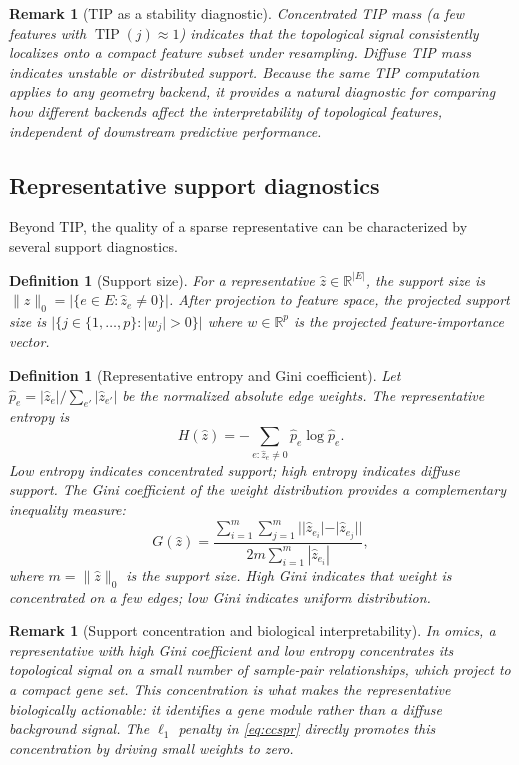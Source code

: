 \documentclass[11pt]{article}
\newtheorem{definition}[theorem]{Definition}
\newtheorem{remark}[theorem]{Remark}
\DeclareMathOperator{\TIP}{TIP}
\begin{document}
\begin{remark}[TIP as a stability diagnostic]\label{rem:tipstability}
Concentrated TIP mass (a few features with $\TIP(j) \approx 1$) indicates that the topological signal consistently localizes onto a compact feature subset under resampling.
Diffuse TIP mass indicates unstable or distributed support.
Because the same TIP computation applies to any geometry backend, it provides a natural diagnostic for comparing how different backends affect the \emph{interpretability} of topological features, independent of downstream predictive performance.
\end{remark}

\subsection{Representative support diagnostics}
\label{sec:diagnostics_math}

Beyond TIP, the quality of a sparse representative can be characterized by several support diagnostics.

\begin{definition}[Support size]\label{def:support}
For a representative $\hat{z} \in \mathbb{R}^{|E|}$, the \emph{support size} is $\|\hat{z}\|_0 = |\{e \in E : \hat{z}_e \ne 0\}|$.
After projection to feature space, the \emph{projected support size} is $|\{j \in \{1,\ldots,p\} : |w_j| > 0\}|$ where $w \in \mathbb{R}^p$ is the projected feature-importance vector.
\end{definition}

\begin{definition}[Representative entropy and Gini coefficient]\label{def:entropy}
Let $\hat{p}_e = |\hat{z}_e| / \sum_{e'} |\hat{z}_{e'}|$ be the normalized absolute edge weights.
The \emph{representative entropy} is
\[
H(\hat{z}) = -\sum_{e : \hat{z}_e \ne 0} \hat{p}_e \log \hat{p}_e.
\]
Low entropy indicates concentrated support; high entropy indicates diffuse support.
The \emph{Gini coefficient} of the weight distribution provides a complementary inequality measure:
\[
G(\hat{z}) = \frac{\sum_{i=1}^m \sum_{j=1}^m ||\hat{z}_{e_i}| - |\hat{z}_{e_j}||}{2m \sum_{i=1}^m |\hat{z}_{e_i}|},
\]
where $m = \|\hat{z}\|_0$ is the support size.
High Gini indicates that weight is concentrated on a few edges; low Gini indicates uniform distribution.
\end{definition}

\begin{remark}[Support concentration and biological interpretability]\label{rem:concentration}
In omics, a representative with high Gini coefficient and low entropy concentrates its topological signal on a small number of sample-pair relationships, which project to a compact gene set.
This concentration is what makes the representative biologically actionable: it identifies a gene module rather than a diffuse background signal.
The $\ell_1$ penalty in \eqref{eq:ccspr} directly promotes this concentration by driving small weights to zero.
\end{remark}
\end{document}

